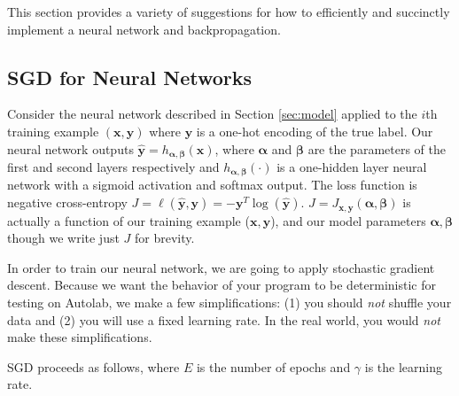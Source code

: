 \documentclass[11pt]{article}
\numberwithin{equation}{section} %
\numberwithin{figure}{section} %
\numberwithin{table}{section} %
\newcommand{\xv}{\mathbf{x}}
\newcommand{\yv}{\mathbf{y}}
\newcommand{\alphav     }{\boldsymbol \alpha     }
\newcommand{\betav      }{\boldsymbol \beta      }
\begin{document}
This section provides a variety of suggestions for how to efficiently and succinctly implement a neural network and backpropagation. 

\subsection{SGD for Neural Networks}
\label{sec:sgd}


Consider the neural network described in Section \ref{sec:model} applied to the $i$th training example $(\xv, \yv)$ where $\yv$ is a one-hot encoding of the true label. Our neural network outputs $\hat{\yv} = h_{\alphav, \betav}(\xv)$, where $\alphav$ and $\betav$ are the parameters of the first and second layers respectively and $h_{\alphav, \betav}(\cdot)$ is a one-hidden layer neural network with a sigmoid activation and softmax output. The loss function is negative cross-entropy $J = \ell(\hat{\yv}, \yv) = - \yv^T \log(\hat{\yv})$. $J = J_{\xv, \yv}(\alphav, \betav)$ is actually a function of our training example ($\xv, \yv$), and our model parameters $\alphav, \betav$ though we write just $J$ for brevity.

In order to train our neural network, we are going to apply stochastic gradient descent. Because we want the behavior of your program to be deterministic for testing on Autolab, we make a few simplifications: (1) you should \emph{not} shuffle your data and (2) you will use a fixed learning rate. In the real world, you would \emph{not} make these simplifications. 

SGD proceeds as follows, where $E$ is the number of epochs and $\gamma$ is the learning rate.
\end{document}

